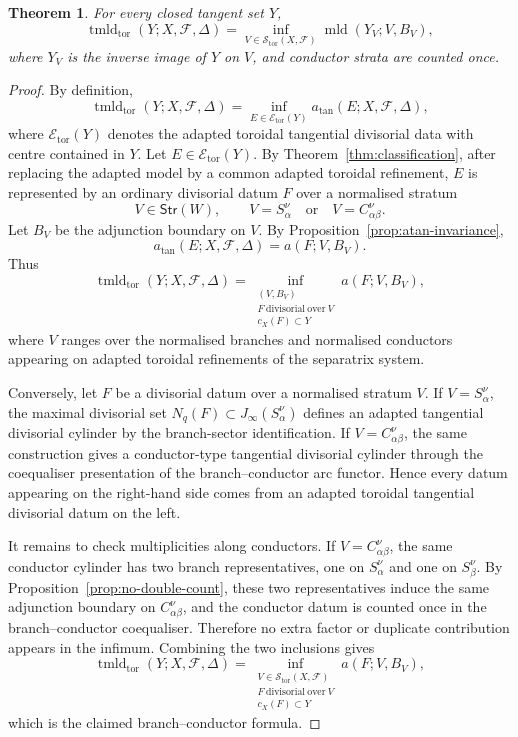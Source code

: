 \documentclass[11pt]{amsart}
\numberwithin{equation}{section}
\theoremstyle{plain}
\newtheorem{Theorem}{Theorem}[section]
\theoremstyle{definition}
\newcommand{\mld}{\operatorname{mld}}
\newcommand{\tmldtor}{\operatorname{tmld}_{\mathrm{tor}}}
\newcommand{\Strata}{\mathsf{Str}}
\newcommand{\cF}{\mathcal F}
\begin{document}
\begin{Theorem}
\label{thm:ioa}
For every closed tangent set $Y$,
\[
\tmldtor(Y;X,\cF,\Delta)=
\inf_{V\in\mathcal S_{\mathrm{tor}}(X,\cF)}\mld(Y_V;V,B_V),
\]
where $Y_V$ is the inverse image of $Y$ on $V$, and conductor strata are counted once.
\end{Theorem}
 \begin{proof}
By definition,
\[
\tmldtor(Y;X,\cF,\Delta)
=
\inf_{E\in\mathcal E_{\mathrm{tor}}(Y)}
a_{\tan}(E;X,\cF,\Delta),
\]
where \(\mathcal E_{\mathrm{tor}}(Y)\) denotes the adapted toroidal
tangential divisorial data with centre contained in \(Y\).
Let \(E\in\mathcal E_{\mathrm{tor}}(Y)\).  By
Theorem~\ref{thm:classification}, after replacing the adapted model by a
common adapted toroidal refinement, \(E\) is represented by an ordinary
divisorial datum \(F\) over a normalised stratum
\[
V\in \Strata(W),
\qquad
V=S_\alpha^\nu
\quad\text{or}\quad
V=C_{\alpha\beta}^\nu .
\]
Let \(B_V\) be the adjunction boundary on \(V\).  By
Proposition~\ref{prop:atan-invariance},
\[
a_{\tan}(E;X,\cF,\Delta)
=
a(F;V,B_V).
\]
Thus
\[
\tmldtor(Y;X,\cF,\Delta)
=
\inf_{\substack{
(V,B_V)\\
F\ \mathrm{divisorial\ over}\ V\\
c_X(F)\subset Y
}}
a(F;V,B_V),
\]
where \(V\) ranges over the normalised branches and normalised conductors
appearing on adapted toroidal refinements of the separatrix system.

Conversely, let \(F\) be a divisorial datum over a normalised stratum
\(V\).  If \(V=S_\alpha^\nu\), the maximal divisorial set
\(N_q(F)\subset J_\infty(S_\alpha^\nu)\) defines an adapted tangential
divisorial cylinder by the branch-sector identification.  If
\(V=C_{\alpha\beta}^\nu\), the same construction gives a conductor-type
tangential divisorial cylinder through the coequaliser presentation of the
branch--conductor arc functor.  Hence every datum appearing on the right-hand
side comes from an adapted toroidal tangential divisorial datum on the left.

It remains to check multiplicities along conductors.  If
\(V=C_{\alpha\beta}^\nu\), the same conductor cylinder has two branch
representatives, one on \(S_\alpha^\nu\) and one on \(S_\beta^\nu\).  By
Proposition~\ref{prop:no-double-count}, these two representatives induce the
same adjunction boundary on \(C_{\alpha\beta}^\nu\), and the conductor datum
is counted once in the branch--conductor coequaliser.  Therefore no extra
factor or duplicate contribution appears in the infimum.
Combining the two inclusions gives
\[
\tmldtor(Y;X,\cF,\Delta)
=
\inf_{\substack{
V\in\mathcal S_{\mathrm{tor}}(X,\cF)\\
F\ \mathrm{divisorial\ over}\ V\\
c_X(F)\subset Y
}}
a(F;V,B_V),
\]
which is the claimed branch--conductor formula.
\end{proof}
\end{document}
